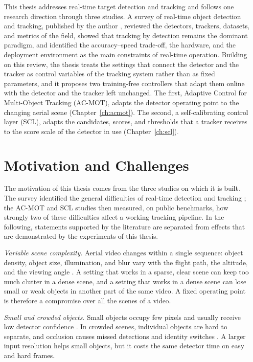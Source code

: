 This thesis addresses real-time target detection and tracking and follows one research direction through three studies. A survey of real-time object detection and tracking, published by the author \cite{ismail2026realtime}, reviewed the detectors, trackers, datasets, and metrics of the field, showed that tracking by detection remains the dominant paradigm, and identified the accuracy--speed trade-off, the hardware, and the deployment environment as the main constraints of real-time operation. Building on this review, the thesis treats the settings that connect the detector and the tracker as control variables of the tracking system rather than as fixed parameters, and it proposes two training-free controllers that adapt them online with the detector and the tracker left unchanged. The first, Adaptive Control for Multi-Object Tracking (AC-MOT), adapts the detector operating point to the changing aerial scene (Chapter~\ref{ch:acmot}). The second, a self-calibrating control layer (SCL), adapts the candidates, scores, and thresholds that a tracker receives to the score scale of the detector in use (Chapter~\ref{ch:scl}).

\section{Motivation and Challenges}\label{sec:intro-motivation}
The motivation of this thesis comes from the three studies on which it is built. The survey identified the general difficulties of real-time detection and tracking \cite{ismail2026realtime}; the AC-MOT and SCL studies then measured, on public benchmarks, how strongly two of these difficulties affect a working tracking pipeline. In the following, statements supported by the literature are separated from effects that are demonstrated by the experiments of this thesis.

\emph{Variable scene complexity.} Aerial video changes within a single sequence: object density, object size, illumination, and blur vary with the flight path, the altitude, and the viewing angle \cite{zhu2022visdrone,du2018uavdt}. A setting that works in a sparse, clear scene can keep too much clutter in a dense scene, and a setting that works in a dense scene can lose small or weak objects in another part of the same video. A fixed operating point is therefore a compromise over all the scenes of a video.

\emph{Small and crowded objects.} Small objects occupy few pixels and usually receive low detector confidence \cite{cheng2023smallobject}. In crowded scenes, individual objects are hard to separate, and occlusion causes missed detections and identity switches \cite{li2025motreview,ismail2026realtime}. A larger input resolution helps small objects, but it costs the same detector time on easy and hard frames.

